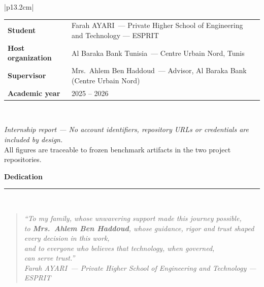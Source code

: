 \documentclass[a4paper,12pt]{report}
\newcommand{\StudentName}{Farah AYARI}
\newcommand{\SchoolName}{Private Higher School of Engineering and Technology --- ESPRIT}
\newcommand{\CompanyName}{Al Baraka Bank Tunisia}
\newcommand{\CompanySite}{Centre Urbain Nord, Tunis}
\newcommand{\SupervisorName}{Mrs.\ Ahlem Ben Haddoud}
\newcommand{\AcademicYear}{2025 -- 2026}
\begin{document}
\begin{titlepage}
\vspace{0.5cm}

\begin{center}
\begin{tabular}{|p{13.2cm}|}
\hline
\\[-6pt]
\begin{tabular}{p{3.6cm}p{9.2cm}}
\small\bfseries\color{espritNavy} Student & \small\color{textDark} \StudentName\ --- \SchoolName \\[2pt]
\small\bfseries\color{espritNavy} Host organization & \small\color{textDark} \CompanyName\ --- \CompanySite \\[2pt]
\small\bfseries\color{abarakaRed} Supervisor & \small\color{textDark} \SupervisorName\ --- Advisor, Al Baraka Bank (Centre Urbain Nord) \\[2pt]
\small\bfseries\color{espritNavy} Academic year & \small\color{textDark} \AcademicYear \\[2pt]
\end{tabular}
\\[-4pt]
\hline
\end{tabular}
\end{center}

\vfill

\begin{center}
{\footnotesize\color{gray!65}\textit{Internship report --- No account identifiers, repository URLs or credentials are included by design.}}\\[2pt]
{\scriptsize\color{gray!55} All figures are traceable to frozen benchmark artifacts in the two project repositories.}
\end{center}
\vspace{0.2cm}

\end{titlepage}

\clearpage
\thispagestyle{empty}
\vspace*{2.2cm}
\begin{center}
{\Large\bfseries\color{chapterBlue} Dedication}\\[0.25cm]
{\color{abarakaRed}\rule{3.2cm}{1.1pt}}\\[0.6cm]
\end{center}
\begin{quote}
\centering
\large\itshape\color{textDark!88}
``To my family, whose unwavering support made this journey possible,\\[3pt]
to \textbf{\color{chapterBlue}Mrs.\ Ahlem Ben Haddoud}, whose guidance, rigor and trust shaped every decision in this work,\\[3pt]
and to everyone who believes that technology, when governed,\\[3pt]
can serve trust.''\\[0.7cm]
\normalsize\upshape\normalfont\color{textDark!75}
\StudentName\ --- \SchoolName
\end{quote}
\end{document}
